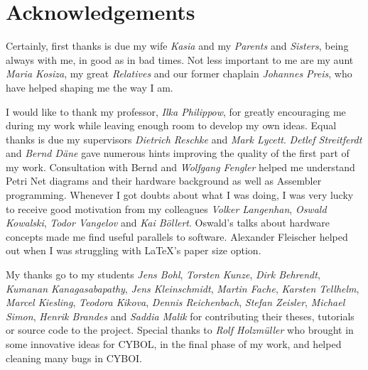 %
%
%
%
%
%
%

\section*{Acknowledgements}
\label{acknowledgements_heading}

Certainly, first thanks is due my wife \emph{Kasia} and my \emph{Parents} and
\emph{Sisters}, being always with me, in good as in bad times. Not less
important to me are my aunt \emph{Maria Kosiza}, my great \emph{Relatives} and
our former chaplain \emph{Johannes Preis}, who have helped shaping me the way I
am.

I would like to thank my professor, \emph{Ilka Philippow}, for greatly
encouraging me during my work while leaving enough room to develop my own
ideas. Equal thanks is due my supervisors \emph{Dietrich Reschke} and
\emph{Mark Lycett}. \emph{Detlef Streitferdt} and \emph{Bernd D\"ane} gave
numerous hints improving the quality of the first part of my work. Consultation
with Bernd and \emph{Wolfgang Fengler} helped me understand Petri Net diagrams
and their hardware background as well as Assembler programming. Whenever I
got doubts about what I was doing, I was very lucky to receive good motivation
from my colleagues \emph{Volker Langenhan}, \emph{Oswald Kowalski},
\emph{Todor Vangelov} and \emph{Kai B\"ollert}. Oswald's talks about hardware
concepts made me find useful parallels to software. Alexander Fleischer helped
out when I was struggling with \LaTeX's paper size option.

My thanks go to my students \emph{Jens Bohl}, \emph{Torsten Kunze},
\emph{Dirk Behrendt}, \emph{Kumanan Kanagasabapathy}, \emph{Jens Kleinschmidt},
\emph{Martin Fache}, \emph{Karsten Tellhelm}, \emph{Marcel Kiesling},
\emph{Teodora Kikova}, \emph{Dennis Reichenbach}, \emph{Stefan Zeisler},
\emph{Michael Simon}, \emph{Henrik Brandes} and \emph{Saddia Malik} for
contributing their theses, tutorials or source code to the project. Special
thanks to \emph{Rolf Holzm\"uller} who brought in some innovative ideas for
CYBOL, in the final phase of my work, and helped cleaning many bugs in CYBOI.

